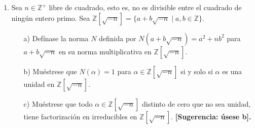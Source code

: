 \documentclass[12pt]{article}
\theoremstyle{definition}
\theoremstyle{remark}
\begin{document}
\begin{enumerate}
    \item Sea $n \in \mathbb{Z}^+$ libre de cuadrado, esto es, no es divisible entre el cuadrado de ningún entero primo. Sea $\mathbb{Z}[\sqrt{-n}] = \{ a + b\sqrt{-n} \mid a, b \in \mathbb{Z} \}$.
    
    \begin{enumerate}
        \item[a)] Defínase la norma $N$ definida por $N(a + b\sqrt{-n}) = a^2 + nb^2$ para $a + b\sqrt{-n}$ en su norma multiplicativa en $\mathbb{Z}[\sqrt{-n}]$.
        
        \item[b)] Muéstrese que $N(\alpha) = 1$ para $\alpha \in \mathbb{Z}[\sqrt{-n}]$ si y solo si $\alpha$ es una unidad en $\mathbb{Z}[\sqrt{-n}]$.
        
        \item[c)] Muéstrese que todo $\alpha \in \mathbb{Z}[\sqrt{-n}]$ distinto de cero que no sea unidad, tiene factorización en irreducibles en $\mathbb{Z}[\sqrt{-n}]$. \textbf{[Sugerencia: úsese b].}
    \end{enumerate}
\end{enumerate}
\end{document}
